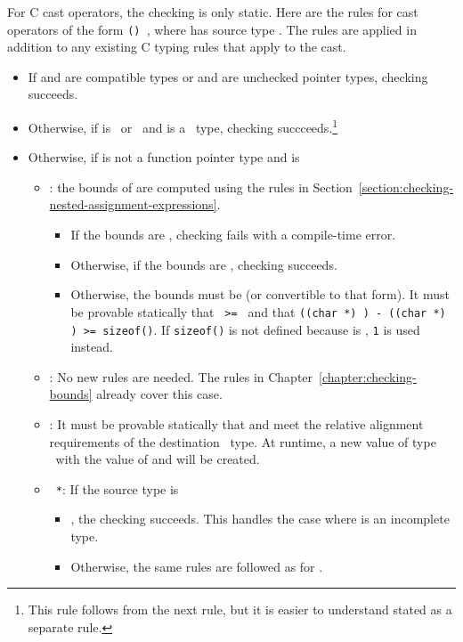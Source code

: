 For C cast operators, the checking is only static.
Here are the rules for cast operators of the form \texttt{() },
where  has source type .  The rules are applied in addition
to any existing C typing rules that apply to the cast.
\begin{itemize}
\item If  and  are compatible types or  and  are unchecked
pointer types, checking succeeds.

\item Otherwise, if  is \ptrvoid\ or \uncheckedptrvoid\ and  is a \ptr\ type, 
checking succceeds.\footnote{This rule follows from the next rule, but it is easier to understand 
stated as a separate rule.}

\item Otherwise, if  is not a function pointer type and  is
\begin{itemize}
\item \ptrT: the bounds of  are computed using the rules
in Section~\ref{section:checking-nested-assignment-expressions}.
\begin{itemize}
\item If the bounds are \boundsnone, checking fails with a compile-time
error.
\item Otherwise, if the bounds are \boundsany, checking 
succeeds.
\item Otherwise, the bounds must be  (or convertible
to that form).  It must be provable statically that \texttt{ >= }
and that {\texttt{((char *) ) - ((char *) ) >= sizeof()}}.
If \texttt{sizeof()} is not defined because  is \void, \texttt{1} is
used instead.
\end{itemize}
\item \arrayptrT: No new rules are needed.   The rules in
Chapter~\ref{chapter:checking-bounds} already cover this case.
\item \spanptrT: It must be provable statically that 
and  meet the relative alignment requirements of
the destination \spanptr\ type.  At runtime, a new value of
type \spanptrT\ with the value of  and  will be created.
\item \texttt{ *}: If the source type  is
\begin{itemize}
\item \ptrT, the checking succeeds. This handles the case where 
is an incomplete type.
\item Otherwise, the same rules are followed as for \ptrT.
\end{itemize}
\end{itemize}


\end{itemize}

